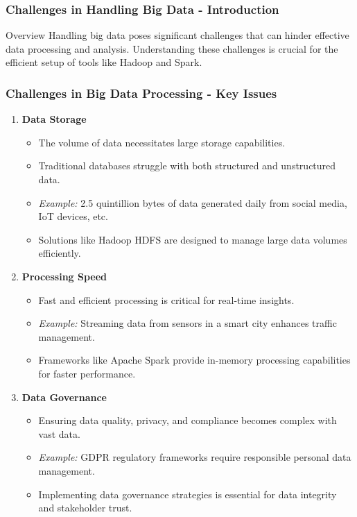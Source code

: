\documentclass[aspectratio=169]{beamer}
\begin{document}
\begin{frame}[fragile]
    \frametitle{Challenges in Handling Big Data - Introduction}
    \begin{block}{Overview}
        Handling big data poses significant challenges that can hinder effective data processing and analysis. 
        Understanding these challenges is crucial for the efficient setup of tools like Hadoop and Spark.
    \end{block}
\end{frame}

\begin{frame}[fragile]
    \frametitle{Challenges in Big Data Processing - Key Issues}
    \begin{enumerate}
        \item \textbf{Data Storage}
            \begin{itemize}
                \item The volume of data necessitates large storage capabilities.
                \item Traditional databases struggle with both structured and unstructured data.
                \item \textit{Example:} 2.5 quintillion bytes of data generated daily from social media, IoT devices, etc.
                \item Solutions like Hadoop HDFS are designed to manage large data volumes efficiently.
            \end{itemize}
    
        \item \textbf{Processing Speed}
            \begin{itemize}
                \item Fast and efficient processing is critical for real-time insights.
                \item \textit{Example:} Streaming data from sensors in a smart city enhances traffic management.
                \item Frameworks like Apache Spark provide in-memory processing capabilities for faster performance.
            \end{itemize}

        \item \textbf{Data Governance}
            \begin{itemize}
                \item Ensuring data quality, privacy, and compliance becomes complex with vast data.
                \item \textit{Example:} GDPR regulatory frameworks require responsible personal data management.
                \item Implementing data governance strategies is essential for data integrity and stakeholder trust.
            \end{itemize}
    \end{enumerate}
\end{frame}
\end{document}
